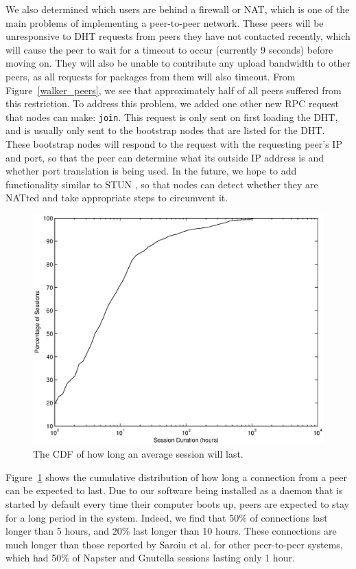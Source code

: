 \documentclass[conference]{IEEEtran}
\begin{document}
We also determined which users are
behind a firewall or NAT, which is one of the main problems of
implementing a peer-to-peer network. These peers will be
unresponsive to DHT requests from peers they have not contacted
recently, which will cause the peer to wait for a timeout to occur
(currently 9 seconds) before moving on. They will also be
unable to contribute any upload bandwidth to other peers, as all
requests for packages from them will also timeout. From
Figure~\ref{walker_peers}, we see that approximately half of all
peers suffered from this restriction. To address this problem, we added one other new RPC request that nodes can make:
\texttt{join}. This request is only sent on first loading the DHT,
and is usually only sent to the bootstrap nodes that are listed for
the DHT. These bootstrap nodes will respond to the request with the
requesting peer's IP and port, so that the peer can determine what
its outside IP address is and whether port translation is being
used. In the future, we hope to add functionality similar to STUN
\cite{STUN}, so that nodes can detect whether they are NATted and
take appropriate steps to circumvent it.


\begin{figure}
\centering
\includegraphics[width=0.80\columnwidth]{AptP2PDuration-peers.eps}
\caption{The CDF of how long an average session will last.}
\label{duration_peers}
\end{figure}

Figure~\ref{duration_peers} shows the cumulative distribution of how
long a connection from a peer can be expected to last. Due to our
software being installed as a daemon that is started by default
every time their computer boots up, peers are expected to stay for a
long period in the system.
Indeed, we find that 50\% of connections last longer than 5
hours, and 20\% last longer than 10 hours. These connections are
much longer than those reported by Saroiu et al. \cite{saroiu2001}
for other peer-to-peer systems, which had 50\% of Napster and Gnutella
sessions lasting only 1 hour.
\end{document}
